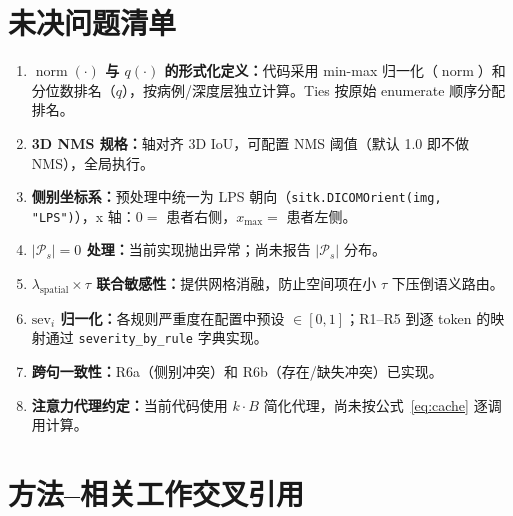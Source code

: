 \documentclass[11pt,a4paper]{article}
\newcommand{\normop}{\operatorname{norm}}
\theoremstyle{definition}
\begin{document}
\section{未决问题清单}

\begin{enumerate}[label=$\square$]
    \item[\checkmark] \textbf{$\normop(\cdot)$ 与 $q(\cdot)$ 的形式化定义：}代码采用 min-max 归一化（$\normop$）和分位数排名（$q$），按病例/深度层独立计算。Ties 按原始 enumerate 顺序分配排名。
    \item[\checkmark] \textbf{3D NMS 规格：}轴对齐 3D IoU，可配置 NMS 阈值（默认 1.0 即不做 NMS），全局执行。
    \item[\checkmark] \textbf{侧别坐标系：}预处理中统一为 LPS 朝向（\texttt{sitk.DICOMOrient(img, "LPS")}），x 轴：$0=$ 患者右侧，$x_{\max}=$ 患者左侧。
    \item[$\square$] \textbf{$|\mathcal{P}_s|=0$ 处理：}当前实现抛出异常；尚未报告 $|\mathcal{P}_s|$ 分布。
    \item[$\square$] \textbf{$\lambda_{\mathrm{spatial}} \times \tau$ 联合敏感性：}提供网格消融，防止空间项在小 $\tau$ 下压倒语义路由。
    \item[\checkmark] \textbf{$\mathrm{sev}_i$ 归一化：}各规则严重度在配置中预设 $\in [0,1]$；R1--R5 到逐 token 的映射通过 \texttt{severity\_by\_rule} 字典实现。
    \item[\checkmark] \textbf{跨句一致性：}R6a（侧别冲突）和 R6b（存在/缺失冲突）已实现。
    \item[$\square$] \textbf{注意力代理约定：}当前代码使用 $k \cdot B$ 简化代理，尚未按公式~\eqref{eq:cache} 逐调用计算。
\end{enumerate}


\section{方法--相关工作交叉引用}
\end{document}
